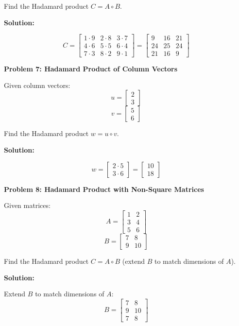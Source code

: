 \documentclass[
  letterpaper,
  DIV=11,
  numbers=noendperiod]{scrreprt}
\theoremstyle{plain}
\theoremstyle{definition}
\theoremstyle{remark}
\begin{document}
Find the Hadamard product \(C=A\circ B\).

\textbf{Solution:}

\[C=\begin{bmatrix}1\cdot 9&2\cdot 8&3\cdot 7\\4\cdot 6&5\cdot 5&6\cdot 4\\7\cdot 3&8\cdot 2&9\cdot 1\end{bmatrix}=\begin{bmatrix}9&16&21\\24&25&24\\21&16&9\end{bmatrix}\]

\textbf{Problem 7: Hadamard Product of Column Vectors}

Given column vectors: \[u=\begin{bmatrix}2\\3\end{bmatrix}\]
\[v=\begin{bmatrix}5\\6\end{bmatrix}\]

Find the Hadamard product \(w=u\circ v\).

\textbf{Solution:}

\[w=\begin{bmatrix}2\cdot 5\\3\cdot 6\end{bmatrix}=\begin{bmatrix}10\\18\end{bmatrix}\]

\textbf{Problem 8: Hadamard Product with Non-Square Matrices}

Given matrices: \[A=\begin{bmatrix}1&2\\3&4\\5&6\end{bmatrix}\]
\[B=\begin{bmatrix}7&8\\9&10\end{bmatrix}\]

Find the Hadamard product \(C=A\circ B\) (extend \(B\) to match
dimensions of \(A\)).

\textbf{Solution:}

Extend \(B\) to match dimensions of \(A\):
\[B=\begin{bmatrix}7&8\\9&10\\7&8\end{bmatrix}\]
\end{document}
